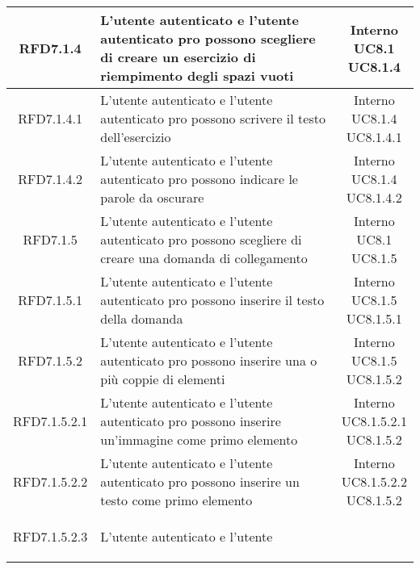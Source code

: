 \begin{longtable}{|c|>{\centering}m{7cm}|c|}
			 \hypertarget{{RFD7.1.4}}{{RFD7.1.4}} & L’utente autenticato e l’utente
autenticato pro possono scegliere di
creare un esercizio di riempimento degli
spazi vuoti & \makecell{Interno\\ UC8.1 \\UC8.1.4 } \\ \hline
			 \hypertarget{{RFD7.1.4.1}}{{RFD7.1.4.1}} & L’utente autenticato e l’utente
autenticato pro possono scrivere il testo
dell’esercizio & \makecell{Interno\\ UC8.1.4 \\UC8.1.4.1 } \\ \hline
			 \hypertarget{{RFD7.1.4.2}}{{RFD7.1.4.2}} & L’utente autenticato e l’utente
autenticato pro possono indicare le parole
da oscurare & \makecell{Interno\\ UC8.1.4 \\UC8.1.4.2 } \\ \hline
			 \hypertarget{{RFD7.1.5}}{{RFD7.1.5}} & L’utente autenticato e l’utente
autenticato pro possono scegliere di
creare una domanda di collegamento & \makecell{Interno\\ UC8.1 \\UC8.1.5 } \\ \hline
			 \hypertarget{{RFD7.1.5.1}}{{RFD7.1.5.1}} & L’utente autenticato e l’utente
autenticato pro possono inserire il testo
della domanda & \makecell{Interno\\ UC8.1.5 \\UC8.1.5.1 } \\ \hline
			 \hypertarget{{RFD7.1.5.2}}{{RFD7.1.5.2}} & L’utente autenticato e l’utente
autenticato pro possono inserire una o
più coppie di elementi & \makecell{Interno\\ UC8.1.5 \\UC8.1.5.2 } \\ \hline
			 \hypertarget{{RFD7.1.5.2.1}}{{RFD7.1.5.2.1}} & L’utente autenticato e l’utente
autenticato pro possono inserire
un’immagine come primo elemento & \makecell{Interno\\ UC8.1.5.2.1 \\UC8.1.5.2 } \\ \hline
			 \hypertarget{{RFD7.1.5.2.2}}{{RFD7.1.5.2.2}} & L’utente autenticato e l’utente
autenticato pro possono inserire un testo
come primo elemento & \makecell{Interno\\ UC8.1.5.2.2 \\UC8.1.5.2 } \\ \hline
			 \hypertarget{{RFD7.1.5.2.3}}{{RFD7.1.5.2.3}} & L’utente autenticato e l’utente

\end{longtable}

